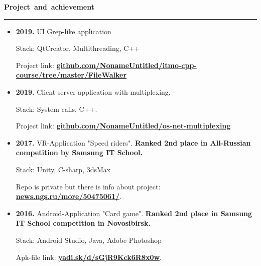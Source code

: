 \documentclass[11pt,a4paper]{report}
\begin{document}
\par\hbox{\Large\textbf{Project and achievement}}\kern5pt\hrule\kern5pt
\begin{itemize}

\item \textbf{2019.} UI Grep-like application

Stack: QtCreator, Multithreading, C++

Project link: 
\textbf{
    \href{https://www.github.com/NonameUntitled/itmo-cpp-course/tree/master/FileWalker}
    {github.com/NonameUntitled/itmo-cpp-course/tree/master/FileWalker}
}

\item \textbf{2019.} Client server application with multiplexing.

Stack: System calls, C++.

Project link: 
\textbf{
    \href{https://www.github.com/NonameUntitled/os-net-multiplexing}
    {github.com/NonameUntitled/os-net-multiplexing}
}


\item \textbf{2017.} VR-Application "Speed riders". \textbf{Ranked 2nd place in All-Russian competition by Samsung IT School.}

Stack: Unity, C-sharp, 3dsMax

Repo is private but there is info about project: 
\textbf{\href{http://news.ngs.ru/more/50475061/}{news.ngs.ru/more/50475061/}}.

\item \textbf{2016.} Android-Application "Card game". \textbf{Ranked 2nd place in Samsung IT School competition in Novosibirsk.} 

Stack: Android Studio, Java, Adobe Photoshop

Apk-file link: \textbf{\href{https://www.yadi.sk/d/sGjR9Kck6R8x0w}{yadi.sk/d/sGjR9Kck6R8x0w}}.

\end{itemize}
\end{document}
